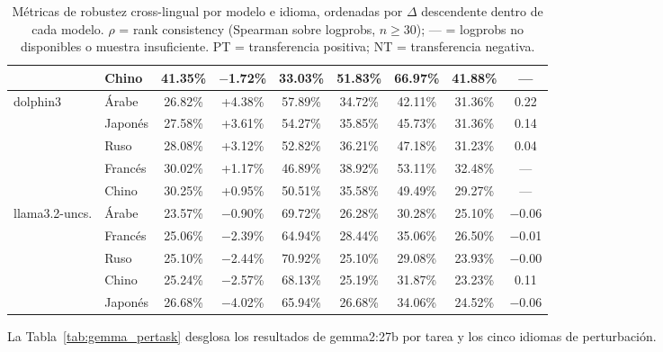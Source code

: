 \documentclass[11pt]{article}
\begin{document}
\begin{table}[t]
\begin{tabular}{llccccccc}
      & Chino   & 41.35\% & $-$1.72\% & 33.03\% & 51.83\% & 66.97\% & 41.88\% & — \\
    \midrule
    \multirow{5}{*}{dolphin3}
      & Árabe   & 26.82\% & +4.38\% & 57.89\% & 34.72\% & 42.11\% & 31.36\% & 0.22 \\
      & Japonés & 27.58\% & +3.61\% & 54.27\% & 35.85\% & 45.73\% & 31.36\% & 0.14 \\
      & Ruso    & 28.08\% & +3.12\% & 52.82\% & 36.21\% & 47.18\% & 31.23\% & 0.04 \\
      & Francés & 30.02\% & +1.17\% & 46.89\% & 38.92\% & 53.11\% & 32.48\% & — \\
      & Chino   & 30.25\% & +0.95\% & 50.51\% & 35.58\% & 49.49\% & 29.27\% & — \\
    \midrule
    \multirow{5}{*}{llama3.2-uncs.}
      & Árabe   & 23.57\% & $-$0.90\% & 69.72\% & 26.28\% & 30.28\% & 25.10\% & $-$0.06 \\
      & Francés & 25.06\% & $-$2.39\% & 64.94\% & 28.44\% & 35.06\% & 26.50\% & $-$0.01 \\
      & Ruso    & 25.10\% & $-$2.44\% & 70.92\% & 25.10\% & 29.08\% & 23.93\% & $-$0.00 \\
      & Chino   & 25.24\% & $-$2.57\% & 68.13\% & 25.19\% & 31.87\% & 23.23\% & 0.11 \\
      & Japonés & 26.68\% & $-$4.02\% & 65.94\% & 26.68\% & 34.06\% & 24.52\% & $-$0.06 \\
    \bottomrule
  \end{tabular}
  \caption{Métricas de robustez cross-lingual por modelo e idioma, ordenadas
  por $\Delta$ descendente dentro de cada modelo. $\rho$ = rank consistency
  (Spearman sobre logprobs, $n \geq 30$); — = logprobs no disponibles
  o muestra insuficiente. PT = transferencia
  positiva; NT = transferencia negativa.}
  \label{tab:cl_robustness}
\end{table}
 
La Tabla~\ref{tab:gemma_pertask} desglosa los resultados de gemma2:27b
por tarea y los cinco idiomas de perturbación.
 
\end{document}
